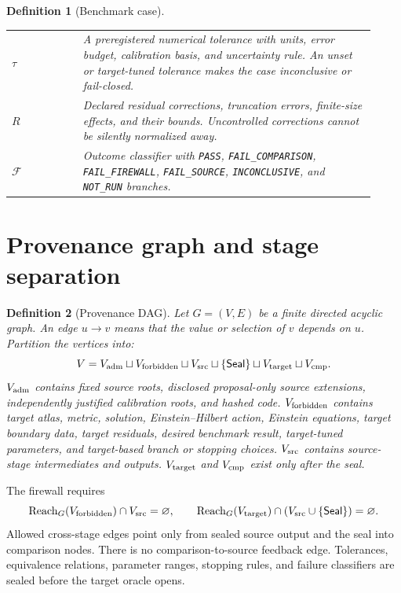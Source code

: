 \documentclass[11pt]{article}
\newtheorem{definition}{Definition}
\newcommand{\Seal}{\mathsf{Seal}}
\newcommand{\Reach}{\operatorname{Reach}}
\begin{document}
\begin{definition}[Benchmark case]
\begin{longtable}{p{0.18\linewidth}p{0.74\linewidth}}
\(\tau\) &
A preregistered numerical tolerance with units, error budget, calibration
basis, and uncertainty rule.  An unset or target-tuned tolerance makes the
case inconclusive or fail-closed.\\
\(R\) &
Declared residual corrections, truncation errors, finite-size effects, and
their bounds.  Uncontrolled corrections cannot be silently normalized away.\\
\(\mathcal F\) &
Outcome classifier with \texttt{PASS}, \texttt{FAIL\_COMPARISON},
\texttt{FAIL\_FIREWALL}, \texttt{FAIL\_SOURCE},
\texttt{INCONCLUSIVE}, and \texttt{NOT\_RUN} branches.\\
\bottomrule
\end{longtable}
\end{definition}

\section{Provenance graph and stage separation}

\begin{definition}[Provenance DAG]
Let \(G=(V,E)\) be a finite directed acyclic graph.  An edge \(u\to v\)
means that the value or selection of \(v\) depends on \(u\).  Partition the
vertices into:
\[
 V=V_{\rm adm}\sqcup V_{\rm forbidden}\sqcup V_{\rm src}
   \sqcup\{\Seal\}\sqcup V_{\rm target}\sqcup V_{\rm cmp}.
\]
\(V_{\rm adm}\) contains fixed source roots, disclosed proposal-only source
extensions, independently justified calibration roots, and hashed code.
\(V_{\rm forbidden}\) contains target atlas, metric, solution,
Einstein--Hilbert action, Einstein equations, target boundary data, target
residuals, desired benchmark result, target-tuned parameters, and target-based
branch or stopping choices.  \(V_{\rm src}\) contains source-stage
intermediates and outputs.  \(V_{\rm target}\) and \(V_{\rm cmp}\) exist only
after the seal.
\end{definition}

The firewall requires
\[
 \Reach_G(V_{\rm forbidden})\cap V_{\rm src}=\varnothing ,
 \qquad
 \Reach_G(V_{\rm target})\cap
 (V_{\rm src}\cup\{\Seal\})=\varnothing.
\]
Allowed cross-stage edges point only from sealed source output and the seal
into comparison nodes.  There is no comparison-to-source feedback edge.
Tolerances, equivalence relations, parameter ranges, stopping rules, and
failure classifiers are sealed before the target oracle opens.
\end{document}
